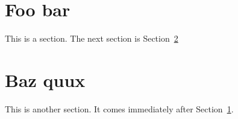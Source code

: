 \section{Foo bar}
\label{sec:foobar}

This is a section. The next section is Section~\ref{sec:bazquux}

\section{Baz quux}
\label{sec:bazquux}

This is another section. It comes immediately after Section~\ref{sec:foobar}.